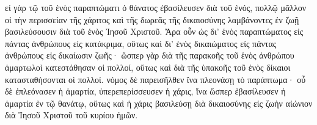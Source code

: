 \documentclass{openreader}
\begin{document}
εἰ γὰρ τῷ τοῦ ἑνὸς παραπτώματι ὁ θάνατος ἐβασίλευσεν διὰ τοῦ ἑνός, πολλῷ μᾶλλον οἱ τὴν περισσείαν τῆς χάριτος καὶ τῆς δωρεᾶς τῆς δικαιοσύνης λαμβάνοντες ἐν ζωῇ βασιλεύσουσιν διὰ τοῦ ἑνὸς Ἰησοῦ Χριστοῦ. 
Ἄρα οὖν ὡς δι’ ἑνὸς παραπτώματος εἰς πάντας ἀνθρώπους εἰς κατάκριμα, οὕτως καὶ δι’ ἑνὸς δικαιώματος εἰς πάντας ἀνθρώπους εἰς δικαίωσιν ζωῆς· 
ὥσπερ γὰρ διὰ τῆς παρακοῆς τοῦ ἑνὸς ἀνθρώπου ἁμαρτωλοὶ κατεστάθησαν οἱ πολλοί, οὕτως καὶ διὰ τῆς ὑπακοῆς τοῦ ἑνὸς δίκαιοι κατασταθήσονται οἱ πολλοί. 
νόμος δὲ παρεισῆλθεν ἵνα πλεονάσῃ τὸ παράπτωμα· οὗ δὲ ἐπλεόνασεν ἡ ἁμαρτία, ὑπερεπερίσσευσεν ἡ χάρις, 
ἵνα ὥσπερ ἐβασίλευσεν ἡ ἁμαρτία ἐν τῷ θανάτῳ, οὕτως καὶ ἡ χάρις βασιλεύσῃ διὰ δικαιοσύνης εἰς ζωὴν αἰώνιον διὰ Ἰησοῦ Χριστοῦ τοῦ κυρίου ἡμῶν. 
\end{document}
